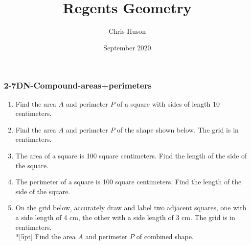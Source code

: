 \documentclass[12pt, twoside]{article}
\title{Regents Geometry}
\author{Chris Huson}
\date{September 2020}
\begin{document}
\subsubsection*{2-7DN-Compound-areas+perimeters}
\begin{enumerate}
\item Find the area $A$ and perimeter $P$ of a square with sides of length 10 centimeters. \vspace{4cm}
    
\item Find the area $A$ and perimeter $P$ of the shape shown below. The grid is in centimeters.
    \begin{flushleft}
    \end{flushleft}
      
\item The area of a square is 100 square centimeters. Find the length of the side of the square. \vspace{3cm}
    
\item The perimeter of a square is 100 square centimeters. Find the length of the side of the square.

    \newpage


\item On the grid below, accurately draw and label two adjacent squares, one with a side length of 4 cm, the other with a side length of 3 cm. The grid is in centimeters.\\*[5pt]
    Find the area $A$ and perimeter $P$ of combined shape.
    \begin{flushleft}
    \end{flushleft} \vspace{1cm} 


\end{enumerate}
\end{document}
